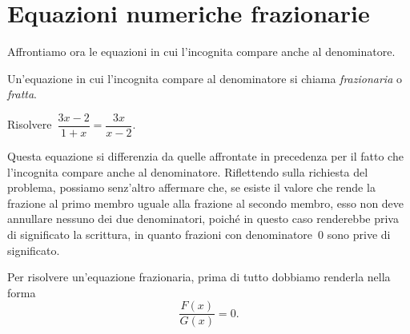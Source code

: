 
\chapter{Equazioni numeriche frazionarie}

Affrontiamo ora le equazioni in cui l'incognita compare anche al denominatore.

\begin{definizione} Un'equazione in cui l'incognita compare al denominatore si chiama \emph{frazionaria} o \emph{fratta}.
\end{definizione}

\begin{exrig}
 \begin{esempio}
Risolvere~$\dfrac{3x-2}{1+x}=\dfrac{3x}{x-2}$.
 \end{esempio}
Questa equazione si differenzia da quelle affrontate in precedenza per il fatto che l'incognita compare anche al denominatore.
Riflettendo sulla richiesta del problema, possiamo senz'altro affermare che, se esiste il valore che rende
la frazione al primo membro uguale alla frazione al secondo membro, esso non deve annullare nessuno dei due denominatori,
poiché in questo caso renderebbe priva di significato la scrittura, in quanto frazioni con denominatore~$0$ sono prive di significato.

Per risolvere un'equazione frazionaria, prima di tutto dobbiamo renderla nella forma
\begin{equation*}
\frac{F(x)}{G(x)}=0.
\end{equation*}


\end{exrig}
